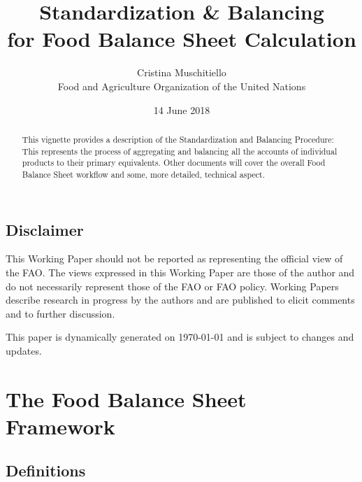 \documentclass[]{article}
\title{Standardization \& Balancing\\
for Food Balance Sheet Calculation}
\author{Cristina Muschitiello\\
Food and Agriculture Organization of the United Nations}
\date{14 June 2018}
\begin{document}
\maketitle
\begin{abstract}
This vignette provides a description of the Standardization and
Balancing Procedure: This represents the process of aggregating and
balancing all the accounts of individual products to their primary
equivalents. Other documents will cover the overall Food Balance Sheet
workflow and some, more detailed, technical aspect.
\end{abstract}

{
\setcounter{tocdepth}{4}
\tableofcontents
}
\newpage

\listoftables

\listoffigures

\newpage

\subsection*{Disclaimer}\label{disclaimer}

This Working Paper should not be reported as representing the official
view of the FAO. The views expressed in this Working Paper are those of
the author and do not necessarily represent those of the FAO or FAO
policy. Working Papers describe research in progress by the authors and
are published to elicit comments and to further discussion.

This paper is dynamically generated on \today{} and is subject to
changes and updates.

\section*{The Food Balance Sheet
Framework}\label{the-food-balance-sheet-framework}

\subsection*{Definitions}\label{definitions}
\end{document}

